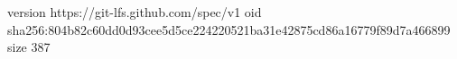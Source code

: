 version https://git-lfs.github.com/spec/v1
oid sha256:804b82c60dd0d93cee5d5ce224220521ba31e42875cd86a16779f89d7a466899
size 387
